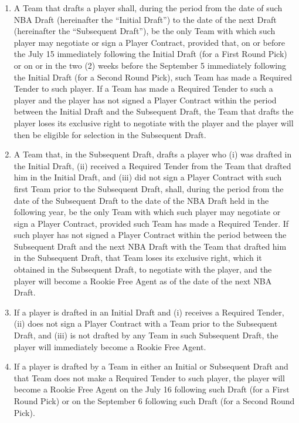 \documentclass[
]{book}
\providecommand{\tightlist}{%
  \setlength{\itemsep}{0pt}\setlength{\parskip}{0pt}}
\begin{document}
\begin{enumerate}
\def\labelenumi{(\alph{enumi})}
\tightlist
\item
  A Team that drafts a player shall, during the period from the date of such NBA Draft (hereinafter the ``Initial Draft'') to the date of the next Draft (hereinafter the ``Subsequent Draft''), be the only Team with which such player may negotiate or sign a Player Contract, provided that, on or before the July 15 immediately following the Initial Draft (for a First Round Pick) or on or in the two (2) weeks before the September 5 immediately following the Initial Draft (for a Second Round Pick), such Team has made a Required Tender to such player. If a Team has made a Required Tender to such a player and the player has not signed a Player Contract within the period between the Initial Draft and the Subsequent Draft, the Team that drafts the player loses its exclusive right to negotiate with the player and the player will then be eligible for selection in the Subsequent Draft.
\item
  A Team that, in the Subsequent Draft, drafts a player who (i) was drafted in the Initial Draft, (ii) received a Required Tender from the Team that drafted him in the Initial Draft, and (iii) did not sign a Player Contract with such first Team prior to the Subsequent Draft, shall, during the period from the date of the Subsequent Draft to the date of the NBA Draft held in the following year, be the only Team with which such player may negotiate or sign a Player Contract, provided such Team has made a Required Tender. If such player has not signed a Player Contract within the period between the Subsequent Draft and the next NBA Draft with the Team that drafted him in the Subsequent Draft, that Team loses its exclusive right, which it obtained in the Subsequent Draft, to negotiate with the player, and the player will become a Rookie Free Agent as of the date of the next NBA Draft.
\item
  If a player is drafted in an Initial Draft and (i) receives a Required Tender, (ii) does not sign a Player Contract with a Team prior to the Subsequent Draft, and (iii) is not drafted by any Team in such Subsequent Draft, the player will immediately become a Rookie Free Agent.
\item
  If a player is drafted by a Team in either an Initial or Subsequent Draft and that Team does not make a Required Tender to such player, the player will become a Rookie Free Agent on the July 16 following such Draft (for a First Round Pick) or on the September 6 following such Draft (for a Second Round Pick).

\end{enumerate}
\end{document}
